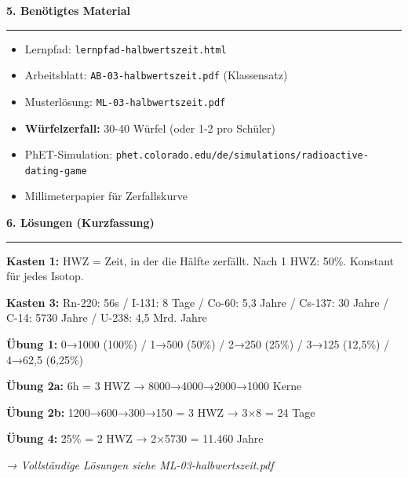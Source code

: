 \documentclass[11pt, a4paper]{article}
\newcommand{\abschnitt}[1]{%
    \vspace{10pt}\noindent\textbf{\textcolor{physik}{\large #1}}\vspace{6pt}\hrule\vspace{8pt}
}
\begin{document}
\vspace{12pt}

\abschnitt{5. Benötigtes Material}

\begin{itemize}
\item Lernpfad: \texttt{lernpfad-halbwertszeit.html}
\item Arbeitsblatt: \texttt{AB-03-halbwertszeit.pdf} (Klassensatz)
\item Musterlösung: \texttt{ML-03-halbwertszeit.pdf}
\item \textbf{Würfelzerfall:} 30-40 Würfel (oder 1-2 pro Schüler)
\item PhET-Simulation: \texttt{phet.colorado.edu/de/simulations/radioactive-dating-game}
\item Millimeterpapier für Zerfallskurve
\end{itemize}

\vspace{12pt}

\abschnitt{6. Lösungen (Kurzfassung)}

\textbf{Kasten 1:} HWZ = Zeit, in der die Hälfte zerfällt. Nach 1 HWZ: 50\%. Konstant für jedes Isotop.

\textbf{Kasten 3:} Rn-220: 56s / I-131: 8 Tage / Co-60: 5,3 Jahre / Cs-137: 30 Jahre / C-14: 5730 Jahre / U-238: 4,5 Mrd. Jahre

\textbf{Übung 1:} 0→1000 (100\%) / 1→500 (50\%) / 2→250 (25\%) / 3→125 (12,5\%) / 4→62,5 (6,25\%)

\textbf{Übung 2a:} 6h = 3 HWZ → 8000→4000→2000→1000 Kerne

\textbf{Übung 2b:} 1200→600→300→150 = 3 HWZ → 3×8 = 24 Tage

\textbf{Übung 4:} 25\% = 2 HWZ → 2×5730 = 11.460 Jahre

\vspace{8pt}
\textit{→ Vollständige Lösungen siehe ML-03-halbwertszeit.pdf}
\end{document}
